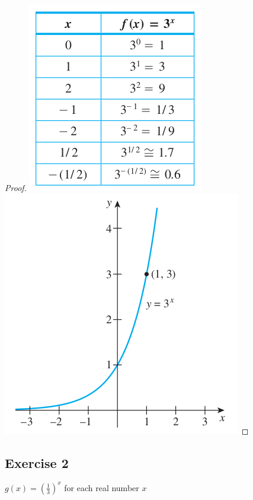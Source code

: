 \documentclass[14pt]{extarticle}
\begin{document}
\begin{proof}
    \includegraphics[scale=0.5]{../images/11.4.1.1.png}
    \includegraphics[scale=0.5]{../images/11.4.1.2.png}
\end{proof}

\subsection{Exercise 2}
\(g(x) = \left(\frac{1}{3}\right)^x\) for each real number \(x\)
\end{document}
